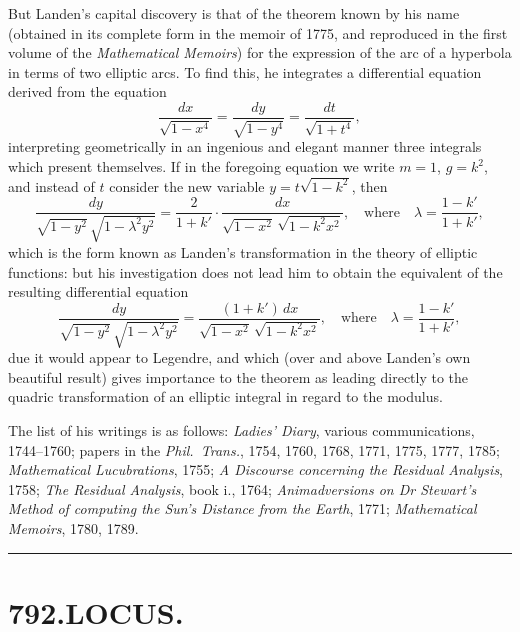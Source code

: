 \documentclass[11pt,a4paper]{article}
\begin{document}
But Landen's capital discovery is that of the theorem known by his name (obtained in its complete form in the memoir of 1775, and reproduced in the first volume of the \textit{Mathematical Memoirs}) for the expression of the arc of a hyperbola in terms of two elliptic arcs. To find this, he integrates a differential equation derived from the equation
\[
\frac{dx}{\sqrt{1 - x^{4}}} = \frac{dy}{\sqrt{1 - y^{4}}} = \frac{dt}{\sqrt{1 + t^{4}}},
\]
interpreting geometrically in an ingenious and elegant manner three integrals which present themselves. If in the foregoing equation we write $m = 1$, $g = k^{2}$, and instead of $t$ consider the new variable $y = t\sqrt{1 - k^{2}}$, then
\[
\frac{dy}{\sqrt{1 - y^{2}}\,\sqrt{1 - \lambda^{2}y^{2}}} = \frac{2}{1 + k'} \cdot \frac{dx}{\sqrt{1 - x^{2}}\,\sqrt{1 - k^{2}x^{2}}},
\quad \text{where}\quad \lambda = \frac{1 - k'}{1 + k'},
\]
which is the form known as Landen's transformation in the theory of elliptic functions: but his investigation does not lead him to obtain the equivalent of the resulting differential equation
\[
\frac{dy}{\sqrt{1 - y^{2}}\,\sqrt{1 - \lambda^{2}y^{2}}} = \frac{(1 + k')\, dx}{\sqrt{1 - x^{2}}\,\sqrt{1 - k^{2}x^{2}}},
\quad \text{where}\quad \lambda = \frac{1 - k'}{1 + k'},
\]
due it would appear to Legendre, and which (over and above Landen's own beautiful result) gives importance to the theorem as leading directly to the quadric transformation of an elliptic integral in regard to the modulus.

The list of his writings is as follows: \textit{Ladies' Diary}, various communications, 1744--1760; papers in the \textit{Phil.\ Trans.}, 1754, 1760, 1768, 1771, 1775, 1777, 1785; \textit{Mathematical Lucubrations}, 1755; \textit{A Discourse concerning the Residual Analysis}, 1758; \textit{The Residual Analysis}, book i., 1764; \textit{Animadversions on Dr Stewart's Method of computing the Sun's Distance from the Earth}, 1771; \textit{Mathematical Memoirs}, 1780, 1789.

\vspace{1em}
\hrule
\vspace{1em}



\section*{792.\quad LOCUS.}
\end{document}
